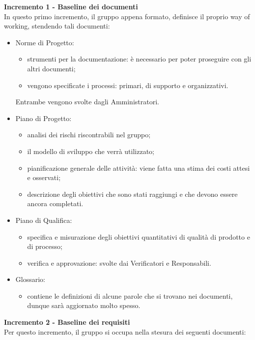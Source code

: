 {{        \textbf{Incremento 1 - Baseline dei documenti} \\ 
    In questo primo incremento, il gruppo appena formato, definisce il proprio way of working, stendendo tali documenti:
    \begin{itemize}
        \item Norme di Progetto:
            \begin{itemize}
                \item strumenti per la documentazione: è necessario per poter proseguire con gli altri documenti;
                \item vengono specificate i processi: primari, di supporto e organizzativi. 
            \end{itemize}
        Entrambe vengono svolte dagli Amministratori.
        \item Piano di Progetto: 
            \begin{itemize}
                \item analisi dei rischi riscontrabili nel gruppo;
                \item il modello di sviluppo che verrà utilizzato;
                \item pianificazione generale delle attività: viene fatta una stima dei costi attesi e osservati;
                \item descrizione degli obiettivi che sono stati raggiungi e che devono essere ancora completati.
            \end{itemize}
        \item Piano di Qualifica: 
            \begin{itemize}
                \item specifica e misurazione degli obiettivi quantitativi di qualità di prodotto e di processo;
                \item verifica e approvazione: svolte dai Verificatori e Responsabili.
            \end{itemize}
        \item Glossario: 
            \begin{itemize}
                \item contiene le definizioni di alcune parole che si trovano nei documenti, dunque sarà aggiornato molto spesso.
            \end{itemize}
    \end{itemize}
    \textbf{Incremento 2 - Baseline dei requisiti} \\
    Per questo incremento, il gruppo si occupa nella stesura dei seguenti documenti:
}}

